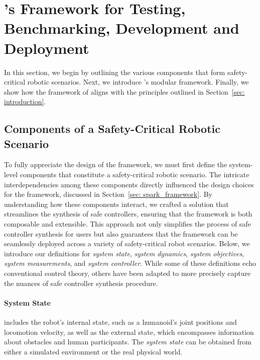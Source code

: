 \section{\spark's Framework for Testing, Benchmarking, Development and Deployment}

In this section, we begin by outlining the various components that form safety-critical robotic scenarios. Next, we introduce \spark's modular framework. Finally, we show how the framework of \spark aligns with the principles outlined in Section~\ref{sec: introduction}.

\subsection{Components of a Safety-Critical Robotic Scenario}
\label{sec: syetem_component}

To fully appreciate the design of the \spark framework, we must first define the system-level components that constitute a safety-critical robotic scenario. 
The intricate interdependencies among these components directly influenced the design choices for the \spark framework, discussed in Section~\ref{sec: spark_framework}. 
By understanding how these components interact, we crafted a solution that streamlines the synthesis of safe controllers, ensuring that the framework is both composable and extensible. 
This approach not only simplifies the process of safe controller synthesis for users but also guarantees that the framework can be seamlessly deployed across a variety of safety-critical robot scenarios.
Below, we introduce our definitions for \textit{system state}, \textit{system dynamics}, \textit{system objectives}, \textit{system measurements}, and \textit{system controller}. 
While some of these definitions echo conventional control theory, others have been adapted to more precisely capture the nuances of safe controller synthesis procedure.

\paragraph{\textbf{System State}} includes the robot's internal state, such as a humanoid's joint positions and locomotion velocity, as well as the external state, which encompasses information about obstacles and human participants. 
The \textit{system state} can be obtained from either a simulated environment or the real physical world.

